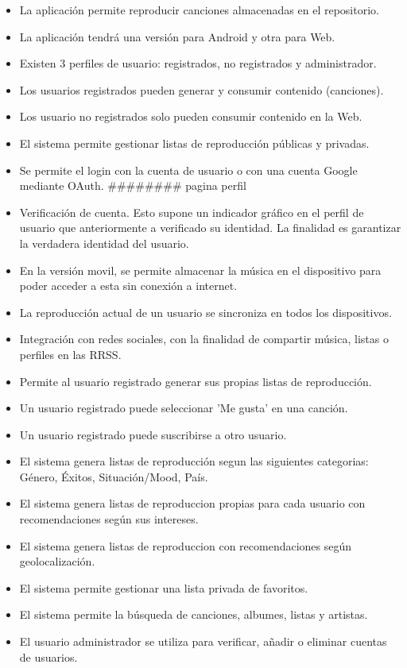 \begin{itemize}
\item La aplicación permite reproducir canciones almacenadas en el repositorio.
\item La aplicación tendrá una versión para Android y otra para Web.
\item Existen 3 perfiles de usuario: registrados, no registrados y administrador.
\item Los usuarios registrados pueden generar y consumir contenido (canciones).
\item Los usuario no registrados solo pueden consumir contenido en la Web.
\item El sistema permite gestionar listas de reproducción públicas y privadas.
\item Se permite el login con la cuenta de usuario o con una cuenta Google mediante OAuth.
######## pagina perfil
\item Verificación de cuenta. Esto supone un indicador gráfico en el perfil de usuario que anteriormente a verificado su identidad. La finalidad es garantizar la verdadera identidad del usuario.
\item En la versión movil, se permite almacenar la música en el dispositivo para poder acceder a esta sin conexión a internet.
\item La reproducción actual de un usuario se sincroniza en todos los dispositivos.
\item Integración con redes sociales, con la finalidad de compartir música, listas o perfiles en las RRSS.
\item Permite al usuario registrado generar sus propias listas de reproducción.

\item Un usuario registrado puede seleccionar 'Me gusta' en una canción.
\item Un usuario registrado puede suscribirse a otro usuario.
\item El sistema genera listas de reproducción segun las siguientes categorias: Género, Éxitos, Situación/Mood, País.
\item El sistema genera listas de reproduccion propias para cada usuario con recomendaciones según sus intereses.
\item El sistema genera listas de reproduccion con recomendaciones según geolocalización.
\item El sistema permite gestionar una lista privada de favoritos.
\item El sistema permite la búsqueda de canciones, albumes, listas y artistas.
\item El usuario administrador se utiliza para verificar, añadir o eliminar cuentas de usuarios.


\end{itemize}
